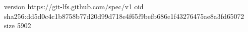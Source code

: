version https://git-lfs.github.com/spec/v1
oid sha256:dd5d0c4c1b8758b77d20d99d718e4f65f9befb686e1f43276475ae8a3fd65072
size 5902

